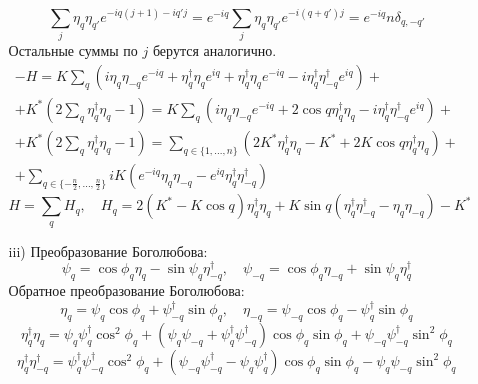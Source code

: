 \documentclass[12pt]{article}
\theoremstyle{definition}
\begin{document}
\begin{enumerate}
\begin{itemize}
\begin{multline}
        \end{multline}
        \begin{equation}
            \sum\limits_j\eta_q\eta_{q'}e^{-iq(j+1)-iq'j}=e^{-iq}\sum\limits_j\eta_q\eta_{q'}e^{-i(q+q')j}=e^{-iq}n\delta_{q,-q'}
        \end{equation}
        Остальные суммы по $j$ берутся аналогично.
        \begin{multline}
            -H=K\sum\limits_q\left(i\eta_q\eta_{-q}e^{-iq}+\eta^\dagger_q\eta_{q}e^{iq}+\eta^\dagger_q\eta_{q}e^{-iq}-i\eta^\dagger_q\eta^\dagger_{-q}e^{iq}\right)+\\+K^*\left(2\sum\limits_{q}\eta^\dagger_q\eta_q-1\right)=K\sum\limits_q\left(i\eta_q\eta_{-q}e^{-iq}+2\cos q\eta^\dagger_q\eta_{q}-i\eta^\dagger_q\eta^\dagger_{-q}e^{iq}\right)+\\+K^*\left(2\sum\limits_{q}\eta^\dagger_q\eta_q-1\right)=\sum\limits_{q\in\{1,...,n\}}(2K^*\eta^\dagger_q\eta_q-K^*+2K\cos q\eta^\dagger_q\eta_q)+\\+\sum\limits_{q\in\{-\frac{n}{2},...,\frac{n}{2}\}}iK(e^{-iq}\eta_q\eta_{-q}-e^{iq}\eta^\dagger_q\eta^\dagger_{-q})
        \end{multline}
        \begin{equation}
            \boxed{H=\sum\limits_qH_q,\quad H_q=2(K^*-K\cos q)\eta^\dagger_q\eta_q+K\sin q(\eta^\dagger_q\eta^\dagger_{-q}-\eta_q\eta_{-q})-K^*}
        \end{equation}
        \item[iii)] Преобразование Боголюбова:
        \begin{equation}
            \psi_q=\cos\phi_q\eta_q-\sin\psi_q\eta^\dagger_{-q},\quad\psi_{-q}=\cos\phi_q\eta_{-q}+\sin\psi_q\eta^\dagger_q
        \end{equation}
        Обратное преобразование Боголюбова:
        \begin{equation}
            \eta_q=\psi_q\cos\phi_q+\psi^\dagger_{-q}\sin\phi_q,\quad\eta_{-q}=\psi_{-q}\cos\phi_q-\psi^\dagger_q\sin\phi_q
        \end{equation}
        \begin{equation}
            \eta^\dagger_q\eta_q=\psi_q\psi^\dagger_q\cos^2\phi_q+(\psi_q\psi_{-q}+\psi^\dagger_q\psi^\dagger_{-q})\cos\phi_q\sin\phi_q+\psi_{-q}\psi^\dagger_{-q}\sin^2\phi_q
        \end{equation}
        \begin{equation}
            \eta^\dagger_q\eta^\dagger_{-q}=\psi^\dagger_q\psi^\dagger_{-q}\cos^2\phi_q+(\psi_{-q}\psi^\dagger_{-q}-\psi_q\psi^\dagger_q)\cos\phi_q\sin\phi_q-\psi_q\psi_{-q}\sin^2\phi_q

\end{equation}
\end{itemize}
\end{enumerate}
\end{document}
